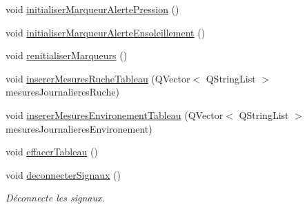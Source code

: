\begin{DoxyCompactItemize}
\item 
void \hyperlink{class_ruche_ihm_a87e4e8d783ea0f15d6304ed604c7ddaa}{initialiser\+Marqueur\+Alerte\+Pression} ()
\item 
void \hyperlink{class_ruche_ihm_a6d52dd904573d1bfc9551421ab53e8cc}{initialiser\+Marqueur\+Alerte\+Ensoleillement} ()
\item 
void \hyperlink{class_ruche_ihm_aa136c7922dc441aa86c00ec2d9c8b71c}{renitialiser\+Marqueurs} ()
\item 
void \hyperlink{class_ruche_ihm_afada4cd970c0e34c3fd62d63e5af7a88}{inserer\+Mesures\+Ruche\+Tableau} (Q\+Vector$<$ Q\+String\+List $>$ mesures\+Journalieres\+Ruche)
\item 
void \hyperlink{class_ruche_ihm_a7c292baed04f6240697afb6c6f894358}{inserer\+Mesures\+Environement\+Tableau} (Q\+Vector$<$ Q\+String\+List $>$ mesures\+Journalieres\+Environement)
\item 
void \hyperlink{class_ruche_ihm_a386868ba4e6e37b9d877fe3ab330e605}{effacer\+Tableau} ()
\item 
void \hyperlink{class_ruche_ihm_a348a76106f3072dd31a382c6025b8113}{deconnecter\+Signaux} ()
\begin{DoxyCompactList}\small\item\em Déconnecte les signaux. \end{DoxyCompactList}\end{DoxyCompactItemize}
